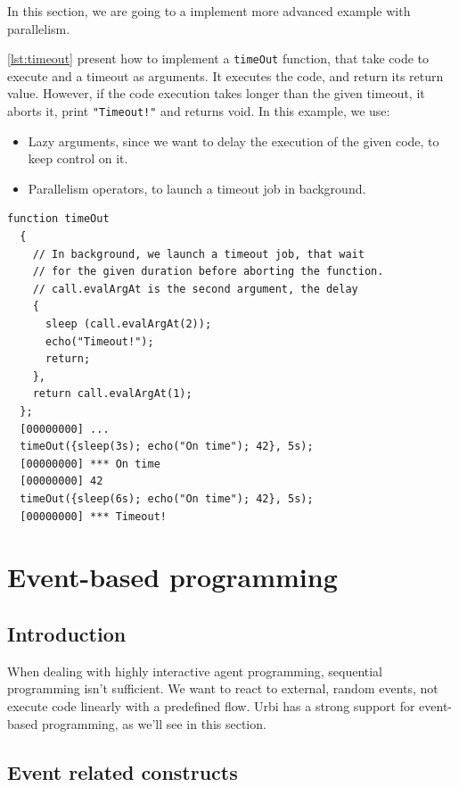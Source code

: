 \documentclass[openright,twoside,12pt]{report}
\newcommand{\urbi}{Urbi\xspace}
\newcommand{\lst}[1]{\autoref{lst:#1}}
\begin{document}
In this section, we are going to a implement more advanced example
with parallelism.

\lst{timeout} present how to implement a \texttt{timeOut} function,
that take code to execute and a timeout as arguments. It executes the
code, and return its return value. However, if the code execution
takes longer than the given timeout, it aborts it, print
\lstinline|"Timeout!"| and returns void. In this example, we use:

\begin{itemize}
\item Lazy arguments, since we want to delay the execution of the
  given code, to keep control on it.
\item Parallelism operators, to launch a timeout job in background.
\end{itemize}

\begin{lstlisting}[caption=Implementing a timeout method, label=lst:timeout]
  function timeOut
  {
    // In background, we launch a timeout job, that wait
    // for the given duration before aborting the function.
    // call.evalArgAt is the second argument, the delay
    {
      sleep (call.evalArgAt(2));
      echo("Timeout!");
      return;
    },
    return call.evalArgAt(1);
  };
  [00000000] ...
  timeOut({sleep(3s); echo("On time"); 42}, 5s);
  [00000000] *** On time
  [00000000] 42
  timeOut({sleep(6s); echo("On time"); 42}, 5s);
  [00000000] *** Timeout!
\end{lstlisting}


\chapter{Event-based programming}

\section{Introduction}

When dealing with highly interactive agent programming, sequential
programming isn't sufficient. We want to react to external, random
events, not execute code linearly with a predefined flow. \urbi has a
strong support for event-based programming, as we'll see in this
section.

\section{Event related constructs}
\end{document}
